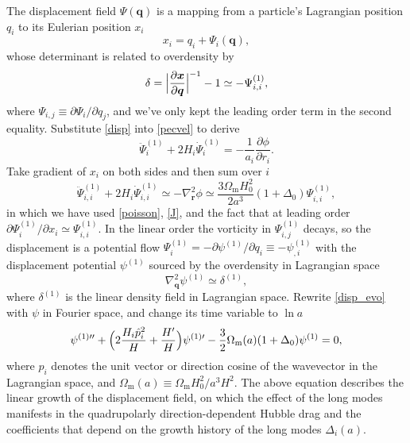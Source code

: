 \documentclass[a4paper,11pt]{article}
\newcommand{\vr}{{\bm r}}
\newcommand{\vx}{{\bm x}}
\newcommand{\vq}{{\bm q}}
\begin{document}
The displacement field $\Psi(\vq)$ is a mapping from a particle's Lagrangian
position $q_i$ to its Eulerian position $x_i$
\begin{equation}
    x_i = q_i + \Psi_i(\vq),
    \label{disp}
\end{equation}
whose determinant is related to overdensity by
\begin{equation}
    \delta = \Bigl| \frac{\partial\vx}{\partial\vq} \Bigr|^{-1} - 1
    \simeq - \Psi_{i,i}^{(1)},
    \label{J}
\end{equation}
where $\Psi_{i,j} \equiv \partial\Psi_i / \partial q_j$, and we've only kept
the leading order term in the second equality.
Substitute \eqref{disp} into \eqref{pecvel} to derive
\begin{equation}
    \ddot \Psi_i^{(1)} + 2 H_i \dot \Psi_i^{(1)} = - \frac1{a_i}
    \frac{\partial\phi}{\partial r_i}.
\end{equation}
Take gradient of $x_i$ on both sides and then sum over $i$
\begin{equation}
    \ddot \Psi_{i,i}^{(1)} + 2 H_i \dot \Psi_{i,i}^{(1)} \simeq - \nabla_\vr^2 \phi
    \simeq \frac{3\Omega_\mathrm{m} H_0^2}{2 a^3} (1 + \Delta_0) \Psi_{i,i}^{(1)},
    \label{disp_evo}
\end{equation}
in which we have used \eqref{poisson}, \eqref{J}, and the fact that at leading
order $\partial\Psi_i^{(1)} / \partial x_i \simeq \Psi_{i,i}^{(1)}$.
In the linear order the vorticity in $\Psi_{i,j}^{(1)}$ decays, so the displacement
is a potential flow $\Psi_i^{(1)} = - \partial\psi^{(1)}/ \partial q_i \equiv -\psi_{,i}^{(1)}$
with the displacement potential $\psi^{(1)}$ sourced by the overdensity in Lagrangian
space
\begin{equation}
    \nabla_\vq^2 \psi^{(1)} \simeq \delta^{(1)},
\end{equation}
where $\delta^{(1)}$ is the linear density field in Lagrangian space.
Rewrite \eqref{disp_evo} with $\psi$ in Fourier space, and change its time
variable to $\ln a$
\begin{equation}
    \psi^{(1)\prime\prime} + \Bigl( 2 \frac{H_i \hat p_i^2} H + \frac{H'} H \Bigr) \psi^{(1)\prime}
    - \frac32 \Omega_\mathrm{m}(a) (1 + \Delta_0) \psi^{(1)} = 0,
    \label{pot_evo}
\end{equation}
where $\hat p_i$ denotes the unit vector or direction cosine of the wavevector
in the Lagrangian space, and $\Omega_\mathrm{m}(a) \equiv \Omega_\mathrm{m}
H_0^2 / a^3 H^2$.
The above equation describes the linear growth of the displacement field, on
which the effect of the long modes manifests in the quadrupolarly
direction-dependent Hubble drag and the coefficients that depend on the growth
history of the long modes $\Delta_i(a)$.
\end{document}

